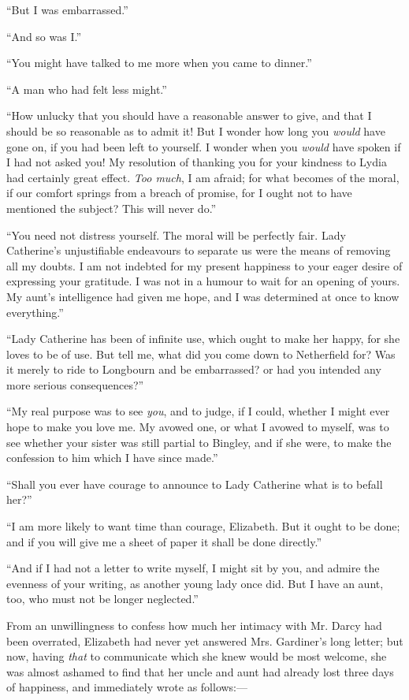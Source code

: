 ``But I was embarrassed.''

``And so was I.''

``You might have talked to me more when you came to dinner.''

``A man who had felt less might.''

``How unlucky that you should have a reasonable answer to give, and that I should be so reasonable as to admit it! But I wonder how long you \textit{would} have gone on, if you had been left to yourself. I wonder when you \textit{would} have spoken if I had not asked you! My resolution of thanking you for your kindness to Lydia had certainly great effect. \textit{Too much}, I am afraid; for what becomes of the moral, if our comfort springs from a breach of promise, for I ought not to have mentioned the subject? This will never do.''

``You need not distress yourself. The moral will be perfectly fair. Lady Catherine's unjustifiable endeavours to separate us were the means of removing all my doubts. I am not indebted for my present happiness to your eager desire of expressing your gratitude. I was not in a humour to wait for an opening of yours. My aunt's intelligence had given me hope, and I was determined at once to know everything.''

``Lady Catherine has been of infinite use, which ought to make her happy, for she loves to be of use. But tell me, what did you come down to Netherfield for? Was it merely to ride to Longbourn and be embarrassed? or had you intended any more serious consequences?''

``My real purpose was to see \textit{you}, and to judge, if I could, whether I might ever hope to make you love me. My avowed one, or what I avowed to myself, was to see whether your sister was still partial to Bingley, and if she were, to make the confession to him which I have since made.''

``Shall you ever have courage to announce to Lady Catherine what is to befall her?''

``I am more likely to want time than courage, Elizabeth. But it ought to be done; and if you will give me a sheet of paper it shall be done directly.''

``And if I had not a letter to write myself, I might sit by you, and admire the evenness of your writing, as another young lady once did. But I have an aunt, too, who must not be longer neglected.''

From an unwillingness to confess how much her intimacy with Mr. Darcy had been overrated, Elizabeth had never yet answered Mrs. Gardiner's long letter; but now, having \textit{that} to communicate which she knew would be most welcome, she was almost ashamed to find that her uncle and aunt had already lost three days of happiness, and immediately wrote as follows:---

